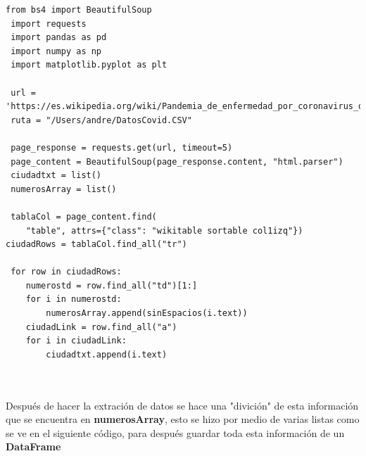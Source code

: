 \documentclass[conference,compsoc,onecolumn]{IEEEtran}
\begin{document}
\lstset{language=Python, breaklines=true, basicstyle=\footnotesize}
\lstset{numbers=left, numberstyle=\tiny, stepnumber=1, numbersep=-2pt}
\begin{lstlisting}[frame=single,caption={Código del web scraping },captionpos=b]
 from bs4 import BeautifulSoup
 import requests
 import pandas as pd
 import numpy as np
 import matplotlib.pyplot as plt

 url = 'https://es.wikipedia.org/wiki/Pandemia_de_enfermedad_por_coronavirus_de_2020_en_Colombia'
 ruta = "/Users/andre/DatosCovid.CSV"

 page_response = requests.get(url, timeout=5)
 page_content = BeautifulSoup(page_response.content, "html.parser")
 ciudadtxt = list()
 numerosArray = list()

 tablaCol = page_content.find(
    "table", attrs={"class": "wikitable sortable col1izq"})
ciudadRows = tablaCol.find_all("tr")

 for row in ciudadRows:
    numerostd = row.find_all("td")[1:]
    for i in numerostd:
        numerosArray.append(sinEspacios(i.text))
    ciudadLink = row.find_all("a")
    for i in ciudadLink:
        ciudadtxt.append(i.text)



\end{lstlisting}
\label{cod}

Después de hacer la extración de datos se hace una "divición" de esta información que se encuentra en \textbf{numerosArray}, esto se hizo por medio de varias listas como se ve en el siguiente código, para después guardar toda esta información de un \textbf{DataFrame}
\end{document}
